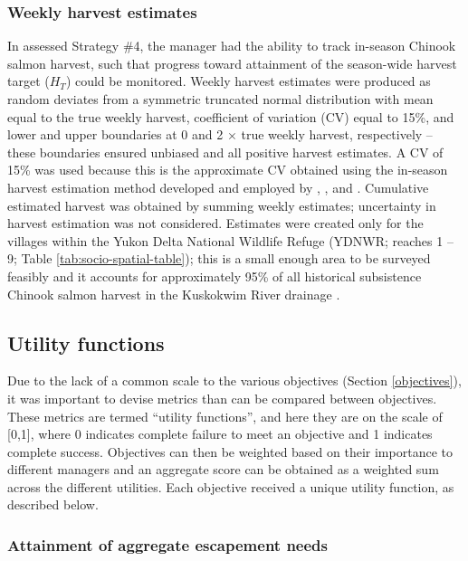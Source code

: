 \documentclass[12pt,]{book}
\theoremstyle{definition}
\theoremstyle{definition}
\theoremstyle{definition}
\theoremstyle{remark}
\begin{document}
\subsubsection{Weekly harvest estimates}\label{harv}

\noindent
In assessed Strategy \#4, the manager had the ability to track in-season
Chinook salmon harvest, such that progress toward attainment of the
season-wide harvest target (\(H_T\)) could be monitored. Weekly harvest
estimates were produced as random deviates from a symmetric truncated
normal distribution with mean equal to the true weekly harvest,
coefficient of variation (CV) equal to 15\%, and lower and upper
boundaries at 0 and 2 \(\times\) true weekly harvest, respectively --
these boundaries ensured unbiased and all positive harvest estimates. A
CV of 15\% was used because this is the approximate CV obtained using
the in-season harvest estimation method developed and employed by
\citet{staton-coggins-2016}, \citet{staton-coggins-2017}, and
\citet{staton-2018}. Cumulative estimated harvest was obtained by
summing weekly estimates; uncertainty in harvest estimation was not
considered. Estimates were created only for the villages within the
Yukon Delta National Wildlife Refuge (YDNWR; reaches 1 -- 9; Table
\ref{tab:socio-spatial-table}); this is a small enough area to be
surveyed feasibly and it accounts for approximately 95\% of all
historical subsistence Chinook salmon harvest in the Kuskokwim River
drainage \citep{hamazaki-2011}.

\subsection{Utility functions}\label{utility-funcs}

\noindent
Due to the lack of a common scale to the various objectives (Section
\ref{objectives}), it was important to devise metrics than can be
compared between objectives. These metrics are termed ``utility
functions'', and here they are on the scale of {[}0,1{]}, where 0
indicates complete failure to meet an objective and 1 indicates complete
success. Objectives can then be weighted based on their importance to
different managers and an aggregate score can be obtained as a weighted
sum across the different utilities. Each objective received a unique
utility function, as described below.

\subsubsection{Attainment of aggregate escapement needs}\label{S-metric}
\end{document}
